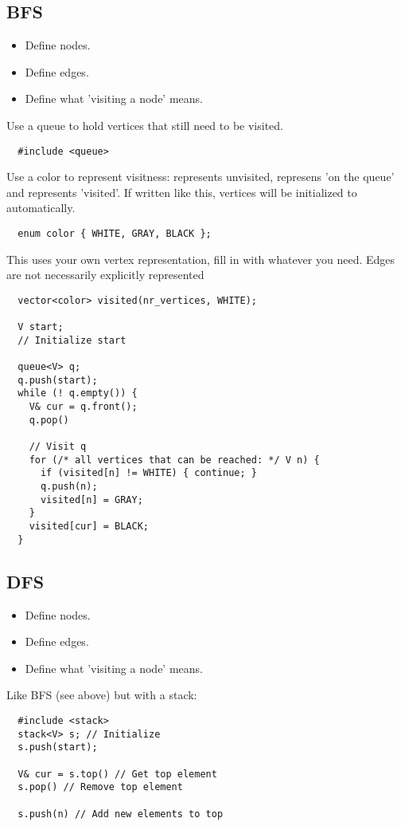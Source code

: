 \documentclass[guide.tex]{subfiles}
\begin{document}
\subsection{BFS}
\begin{itemize}
  \item Define nodes.
  \item Define edges.
  \item Define what 'visiting a node' means.
\end{itemize}

Use a queue to hold vertices that still need to be visited.
\begin{verbatim}
  #include <queue>
\end{verbatim}
Use a color to represent visitness:  represents unvisited,  represens 'on the queue' and  represents 'visited'.
If written like this, vertices will be initialized to  automatically.
\begin{verbatim}
  enum color { WHITE, GRAY, BLACK };
\end{verbatim}
This uses your own vertex representation, fill in  with whatever you need.
Edges are not necessarily explicitly represented
\begin{verbatim}
  vector<color> visited(nr_vertices, WHITE);

  V start;
  // Initialize start

  queue<V> q;
  q.push(start);
  while (! q.empty()) {
    V& cur = q.front();
    q.pop()

    // Visit q
    for (/* all vertices that can be reached: */ V n) {
      if (visited[n] != WHITE) { continue; }
      q.push(n);
      visited[n] = GRAY;
    }
    visited[cur] = BLACK;
  }
\end{verbatim}

\subsection{DFS}
\begin{itemize}
  \item Define nodes.
  \item Define edges.
  \item Define what 'visiting a node' means.
\end{itemize}

Like BFS (see above) but with a stack:
\begin{verbatim}
  #include <stack>
  stack<V> s; // Initialize
  s.push(start);

  V& cur = s.top() // Get top element
  s.pop() // Remove top element

  s.push(n) // Add new elements to top
\end{verbatim}
\end{document}
